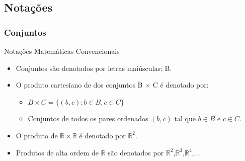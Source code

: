 \documentclass{beamer}
\begin{document}
\subsection{Notações}
\begin{frame}
\frametitle{Conjuntos}


	\begin{block}{Notações Matemáticas Convencionais}
		\begin{itemize}
			\item<1-> Conjuntos são denotados por letras maiúsculas: B.
			\item<2-> O produto cartesiano de dos conjuntos B $\times$ C é denotado por:
				\begin{itemize}
					\item $ B \times C = \{(b,c) : b \in B ,  c \in C\}$
					\item Conjuntos de todos os pares ordenados $(b,c)$ tal que  $b \in B$ e $c \in C$.
				\end{itemize}
			\item<3-> O produto de $\mathbb{R} \times \mathbb{R}$ é denotado por $\mathbb{R}^2$.
			\item<4-> Produtos de alta ordem de $\mathbb{R}$ são denotados por $\mathbb{R}^2$,$\mathbb{R}^3$,$\mathbb{R}^4$,...
		\end{itemize}
	\end{block}
	
\end{frame}

\end{document}
